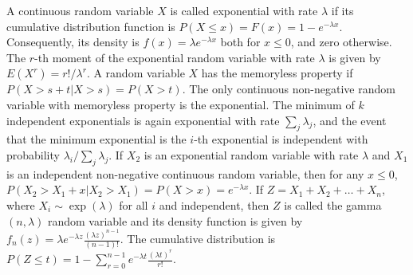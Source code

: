  A continuous random variable $X$ is called exponential with rate $\lambda$ if its cumulative distribution function is $P(X \le x) = F(x) = 1-e^{-\lambda x}$. Consequently, its density is $f(x) = \lambda e^{-\lambda x}$ both for $x \le 0$, and zero otherwise.
 The $r$-th moment of the exponential random variable with rate $\lambda$ is given by $E(X^r) = r!/\lambda^r$.
 A random variable $X$ has the memoryless property if 
$P(X > s + t | X> s) = P(X > t)$.
 The only continuous non-negative random variable with memoryless property is the exponential.
 The minimum of $k$ independent exponentials is again exponential with rate $\sum_j \lambda_j$, and the event that the minimum exponential is the $i$-th exponential is independent with probability $\lambda_i/\sum_j\lambda_j$.
 If $X_2$ is an exponential random variable with rate $\lambda$ and $X_1$ is an independent non-negative continuous random variable, then for any $x \le 0$, $P(X_2 > X_1 +x|X_2 > X_1) = P(X > x) = e^{-\lambda x}$.
 If $Z = X_1 + X_2 + \ldots + X_n$, where $X_i \sim \exp(\lambda)$ for all $i$ and independent, then $Z$ is called the gamma $(n, \lambda)$ random variable and its density function is given by $f_n(z) = \lambda e^{-\lambda z} \frac{(\lambda z)^{n-1}}{(n-1)!}$. The cumulative distribution is 
$P(Z \le t) = 1 - \sum^{n-1}_{r=0} e^{-\lambda t} \frac{(\lambda t)^r}{r!}$.